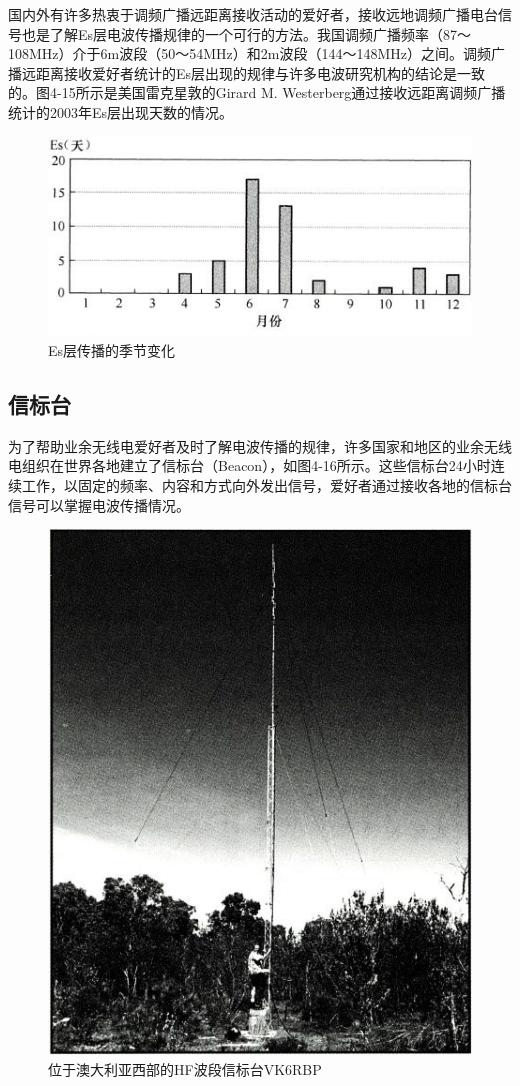 \documentclass[12pt,UTF8]{ctexbook}
\begin{document}
国内外有许多热衷于调频广播远距离接收活动的爱好者，接收远地调频广播电台信号也是了解Es层电波传播规律的一个可行的方法。我国调频广播频率（87～108MHz）介于6m波段（50～54MHz）和2m波段（144～148MHz）之间。调频广播远距离接收爱好者统计的Es层出现的规律与许多电波研究机构的结论是一致的。图4-15所示是美国雷克星敦的Girard M. Westerberg通过接收远距离调频广播统计的2003年Es层出现天数的情况。

\begin{figure}[htbp]
	\centering
	\includegraphics[width=0.7\linewidth]{58}
	\caption{Es层传播的季节变化}
	\label{fig:1}
\end{figure}

\subsection{信标台}

为了帮助业余无线电爱好者及时了解电波传播的规律，许多国家和地区的业余无线电组织在世界各地建立了信标台（Beacon），如图4-16所示。这些信标台24小时连续工作，以固定的频率、内容和方式向外发出信号，爱好者通过接收各地的信标台信号可以掌握电波传播情况。

\begin{figure}[htbp]
	\centering
	\includegraphics[width=0.7\linewidth]{59}
	\caption{位于澳大利亚西部的HF波段信标台VK6RBP}
	\label{fig:1}
\end{figure}
\end{document}
